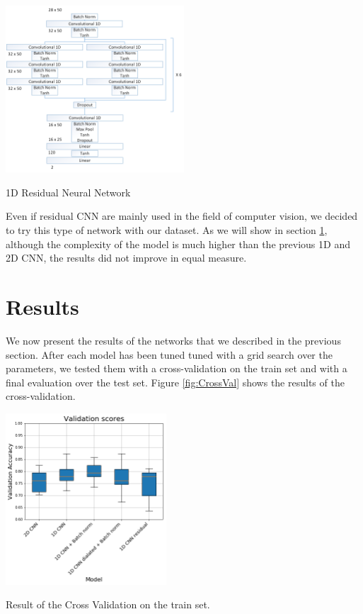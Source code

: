 \documentclass[10pt,conference,compsocconf]{IEEEtran}
\begin{document}

\begin{center}
	\captionsetup{type=figure}
	\includegraphics[width=0.5\textwidth]{img/Residual1D.png}
	\caption {1D Residual Neural Network}
	\label{fig:Residual}
\end{center}

Even if residual CNN are mainly used in the field of computer vision, we decided to try this type of network with our dataset. As we will show in section \ref{sec:results}, although the complexity of the model is much higher than the previous 1D and 2D CNN, the results did not improve in equal measure.

\section{Results}
\label{sec:results}
We now present the results of the networks that we described in the previous section. After each model has been tuned tuned with a grid search over the parameters, we tested them with a cross-validation on the train set and with a final evaluation over the test set. Figure \ref{fig:CrossVal} shows the results of the cross-validation.

\begin{center}
	\captionsetup{type=figure}
	\includegraphics[width=0.45\textwidth]{img/CrossVal.png}
	\caption {Result of the Cross Validation on the train set.}
	\label{fig:CrossVal}
\end{center}
\end{document}
